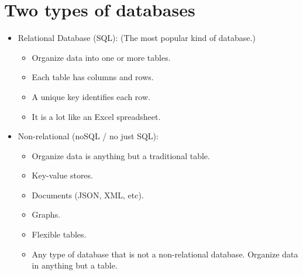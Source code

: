 \section{Two types of databases}
\begin{itemize}
    \item Relational Database (SQL): (The most popular kind of database.)
        \begin{itemize}
            \item Organize data into one or more tables.
            \item Each table has columns and rows.
            \item A unique key identifies each row.
            \item It is a lot like an Excel spreadsheet.
        \end{itemize}
    
    \item Non-relational (noSQL / no just SQL):
        \begin{itemize}
            \item Organize data is anything but a traditional table.
            \item Key-value stores.
            \item Documents (JSON, XML, etc).
            \item Graphs.
            \item Flexible tables.
            \item Any type of database that is not a non-relational database. Organize data in anything but a table.
        \end{itemize}
\end{itemize}


